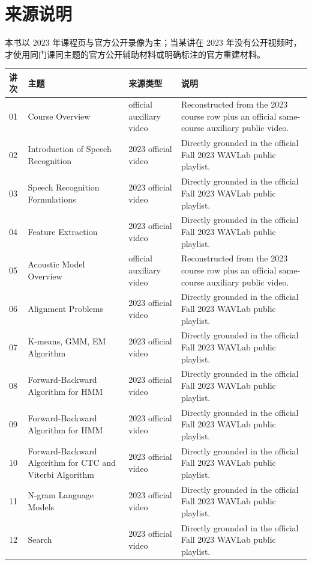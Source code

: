 \documentclass[a4paper]{article}
\begin{document}
\section*{来源说明}
本书以 2023 年课程页与官方公开录像为主；当某讲在 2023 年没有公开视频时，才使用同门课同主题的官方公开辅助材料或明确标注的官方重建材料。
\begin{longtable}{p{}p{}p{}p{}}
\textbf{讲次} & \textbf{主题} & \textbf{来源类型} & \textbf{说明}\\
\hline
01 & Course Overview & official auxiliary video & Reconstructed from the 2023 course row plus an official same-course auxiliary public video.\\
02 & Introduction of Speech Recognition & 2023 official video & Directly grounded in the official Fall 2023 WAVLab public playlist.\\
03 & Speech Recognition Formulations & 2023 official video & Directly grounded in the official Fall 2023 WAVLab public playlist.\\
04 & Feature Extraction & 2023 official video & Directly grounded in the official Fall 2023 WAVLab public playlist.\\
05 & Acoustic Model Overview & official auxiliary video & Reconstructed from the 2023 course row plus an official same-course auxiliary public video.\\
06 & Alignment Problems & 2023 official video & Directly grounded in the official Fall 2023 WAVLab public playlist.\\
07 & K-means, GMM, EM Algorithm & 2023 official video & Directly grounded in the official Fall 2023 WAVLab public playlist.\\
08 & Forward-Backward Algorithm for HMM & 2023 official video & Directly grounded in the official Fall 2023 WAVLab public playlist.\\
09 & Forward-Backward Algorithm for HMM & 2023 official video & Directly grounded in the official Fall 2023 WAVLab public playlist.\\
10 & Forward-Backward Algorithm for CTC and Viterbi Algorithm & 2023 official video & Directly grounded in the official Fall 2023 WAVLab public playlist.\\
11 & N-gram Language Models & 2023 official video & Directly grounded in the official Fall 2023 WAVLab public playlist.\\
12 & Search & 2023 official video & Directly grounded in the official Fall 2023 WAVLab public playlist.\\

\end{longtable}
\end{document}
